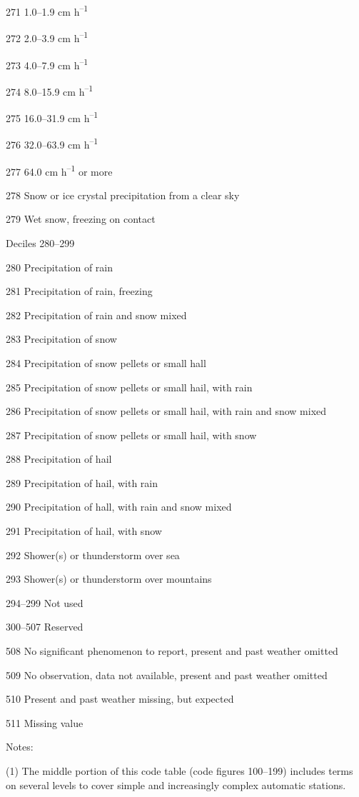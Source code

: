 271 1.0--1.9 cm h\textsuperscript{--1}

272 2.0--3.9 cm h\textsuperscript{--1}

273 4.0--7.9 cm h\textsuperscript{--1}

274 8.0--15.9 cm h\textsuperscript{--1}

275 16.0--31.9 cm h\textsuperscript{--1}

276 32.0--63.9 cm h\textsuperscript{--1}

277 64.0 cm h\textsuperscript{--1} or more

278 Snow or ice crystal precipitation from a clear sky

279 Wet snow, freezing on contact

Deciles 280--299

280 Precipitation of rain

281 Precipitation of rain, freezing

282 Precipitation of rain and snow mixed

283 Precipitation of snow

284 Precipitation of snow pellets or small hall

285 Precipitation of snow pellets or small hail, with rain

286 Precipitation of snow pellets or small hail, with rain and snow mixed

287 Precipitation of snow pellets or small hail, with snow

288 Precipitation of hail

289 Precipitation of hail, with rain

290 Precipitation of hall, with rain and snow mixed

291 Precipitation of hail, with snow

292 Shower(s) or thunderstorm over sea

293 Shower(s) or thunderstorm over mountains

294--299 Not used

300--507 Reserved

508 No significant phenomenon to report, present and past weather omitted

509 No observation, data not available, present and past weather omitted

510 Present and past weather missing, but expected

511 Missing value

Notes:

(1) The middle portion of this code table (code figures 100--199) includes terms on several levels to cover simple and increasingly complex automatic stations.

